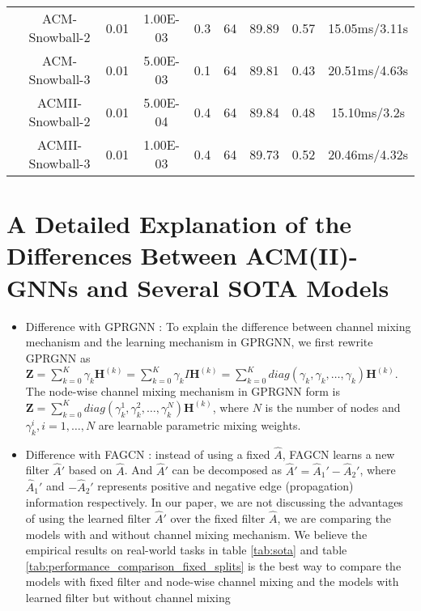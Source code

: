 \documentclass{article}
\newcommand{\0}{{\boldsymbol{0}}}
\newcommand{\6}{{\partial}}
\newcommand{\8}{{\infty}}
\newcommand{\4}{{\nabla}}
\begin{document}
\begin{table}[htbp]
{\begin{tabular}{c|c|ccccccc}
          & ACM-Snowball-2 & 0.01  & 1.00E-03 & 0.3   & 64    & 89.89 & 0.57  & 15.05ms/3.11s \\
          & ACM-Snowball-3 & 0.01  & 5.00E-03 & 0.1   & 64    & 89.81 & 0.43  & 20.51ms/4.63s \\
          & ACMII-Snowball-2 & 0.01  & 5.00E-04 & 0.4   & 64    & 89.84 & 0.48  & 15.10ms/3.2s \\
          & ACMII-Snowball-3 & 0.01  & 1.00E-03 & 0.4   & 64    & 89.73 & 0.52  & 20.46ms/4.32s \\
    \bottomrule
    \bottomrule
    \end{tabular}}
  \label{tab:optimal_hyperparameters_fixed_splits}\end{table} \section{A Detailed Explanation of the Differences Between ACM(II)-GNNs and Several SOTA Models}

\begin{itemize}
    \item Difference with GPRGNN \cite{chien2021adaptive}: To explain the difference between channel mixing mechanism and the learning mechanism in GPRGNN, we first rewrite GPRGNN as $\mathbf{Z} = \sum\limits_{k=0}^{K} \gamma_{k} \mathbf{H}^{(k)} = \sum\limits_{k=0}^{K} \gamma_{k} I \mathbf{H}^{(k)} = \sum\limits_{k=0}^{K} diag(\gamma_{k}, \gamma_{k},\dots,\gamma_{k}) \mathbf{H}^{(k)}$. The node-wise channel mixing mechanism in GPRGNN form is $\mathbf{Z} = \sum\limits_{k=0}^{K} diag(\gamma_{k}^1,\gamma_{k}^2,\dots,\gamma_{k}^N) \mathbf{H}^{(k)}$, where $N$ is the number of nodes and $\gamma_{k}^i, i=1,\dots,N$ are learnable parametric mixing weights.

    \item Difference with FAGCN \cite{bo2021beyond}: instead of using a fixed $\hat{A}$, FAGCN learns a new filter $\hat{A}'$ based on $\hat{A}$. And $\hat{A}'$ can be decomposed as $\hat{A}'=\hat{A}_1'-\hat{A}_2'$, where $\hat{A}_1'$ and $-\hat{A}_2'$ represents positive and negative edge (propagation) information respectively. In our paper, we are not discussing the advantages of using the learned filter $\hat{A}'$ over the fixed filter $\hat{A}$, we are comparing the models with and without channel mixing mechanism. We believe the empirical results on real-world tasks in table \ref{tab:sota} and table \ref{tab:performance_comparison_fixed_splits} is the best way to compare the models with fixed filter and node-wise channel mixing and the models with learned filter but without channel mixing
\end{itemize}
\end{document}
